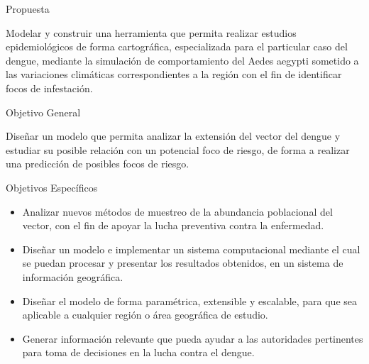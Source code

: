 \begin{frame}[c]{Propuesta}
    \begin{center}
    Modelar y construir una herramienta que permita realizar estudios epidemiológicos de forma
    cartográfica, especializada para el particular caso del dengue, mediante la simulación de
    comportamiento del Aedes aegypti sometido a las variaciones climáticas correspondientes a la
    región con el fin de identificar focos de infestación.
    \end{center}
\end{frame}


\begin{frame}[c]{Objetivo General}
    \begin{center}
    Diseñar un modelo que permita analizar la extensión del vector del dengue y estudiar su posible
    relación con un potencial foco de riesgo, de forma a realizar una predicción de posibles focos
    de riesgo.
    \end{center}
\end{frame}


\begin{frame}[t]{Objetivos Específicos}
    \begin{center}
        \begin{itemize}
        \item Analizar nuevos métodos de muestreo de la abundancia poblacional del vector, con el fin de apoyar la lucha preventiva contra la enfermedad.

        \item Diseñar un modelo e implementar un sistema computacional mediante el cual se puedan procesar y presentar los resultados obtenidos, en un sistema de información geográfica.

        \item Diseñar el modelo de forma paramétrica, extensible y escalable, para que sea aplicable a cualquier región o área geográfica de estudio.

        \item Generar información relevante que pueda ayudar a las autoridades pertinentes para toma de decisiones en la lucha contra el dengue.
        \end{itemize}
    \end{center}
\end{frame}

